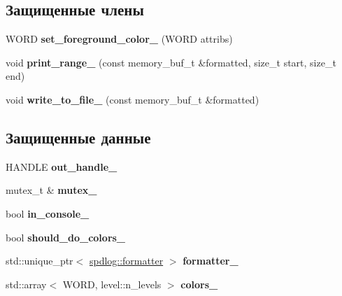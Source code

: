 \subsection*{Защищенные члены}
\begin{DoxyCompactItemize}
\item 
\mbox{\label{classspdlog_1_1sinks_1_1wincolor__sink_a70cf48f75a9dea45cf1efd87ae95a933}} 
W\+O\+RD {\bfseries set\+\_\+foreground\+\_\+color\+\_\+} (W\+O\+RD attribs)
\item 
\mbox{\label{classspdlog_1_1sinks_1_1wincolor__sink_a83f157973bbc72592e58d7cc02485944}} 
void {\bfseries print\+\_\+range\+\_\+} (const memory\+\_\+buf\+\_\+t \&formatted, size\+\_\+t start, size\+\_\+t end)
\item 
\mbox{\label{classspdlog_1_1sinks_1_1wincolor__sink_a5cf97fd57b3863ba2a288d357ec0e579}} 
void {\bfseries write\+\_\+to\+\_\+file\+\_\+} (const memory\+\_\+buf\+\_\+t \&formatted)
\end{DoxyCompactItemize}
\subsection*{Защищенные данные}
\begin{DoxyCompactItemize}
\item 
\mbox{\label{classspdlog_1_1sinks_1_1wincolor__sink_a99b305614c9da0eeef723a2eaee7e418}} 
H\+A\+N\+D\+LE {\bfseries out\+\_\+handle\+\_\+}
\item 
\mbox{\label{classspdlog_1_1sinks_1_1wincolor__sink_a629a4ad9f5d05d23b6b560634891eeee}} 
mutex\+\_\+t \& {\bfseries mutex\+\_\+}
\item 
\mbox{\label{classspdlog_1_1sinks_1_1wincolor__sink_a35c1a1ccf302d2e77f3c8acfae58ae8e}} 
bool {\bfseries in\+\_\+console\+\_\+}
\item 
\mbox{\label{classspdlog_1_1sinks_1_1wincolor__sink_a0cc52ce74e7c4d84867252697fe8ecf1}} 
bool {\bfseries should\+\_\+do\+\_\+colors\+\_\+}
\item 
\mbox{\label{classspdlog_1_1sinks_1_1wincolor__sink_a758767c5ca0aaf9b7de3b29aceabfd89}} 
std\+::unique\+\_\+ptr$<$ \hyperlink{classspdlog_1_1formatter}{spdlog\+::formatter} $>$ {\bfseries formatter\+\_\+}
\item 
\mbox{\label{classspdlog_1_1sinks_1_1wincolor__sink_a3d3384230860ad820259bf11c6596e74}} 
std\+::array$<$ W\+O\+RD, level\+::n\+\_\+levels $>$ {\bfseries colors\+\_\+}
\end{DoxyCompactItemize}


